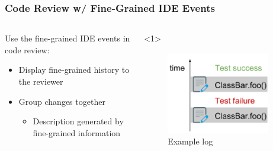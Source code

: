 \documentclass[aspectratio=169]{beamer}
\begin{document}
\begin{frame}[fragile]

\frametitle{Code Review w/ Fine-Grained IDE Events}

\begin{columns}

\begin{column}{0.5\textwidth}

Use the fine-grained IDE events in code review:

\begin{itemize}
\item<1-> Display fine-grained history to the reviewer
\item<2-> Group changes together
\begin{itemize}
\item<2-> Description generated by fine-grained information
\end{itemize}

\end{itemize}
\end{column}

\begin{column}{0.5\textwidth}

\begin{onlyenv}<1>
\begin{figure}
\begin{center}
\includegraphics[width=0.9\textwidth]{img/example_log.pdf}
\end{center}
\caption{Example log}
\end{figure}
\end{onlyenv}


\end{column}
\end{columns}
\end{frame}
\end{document}
